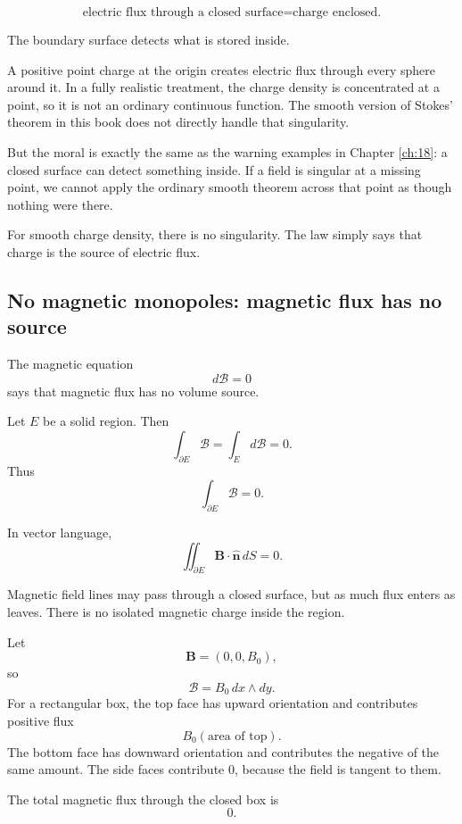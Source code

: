 \[
\boxed{
    \text{electric flux through a closed surface}
    =
    \text{charge enclosed.}
}
\]

The boundary surface detects what is stored inside.

\begin{example}
A positive point charge at the origin creates electric flux through every sphere around
it.  In a fully realistic treatment, the charge density is concentrated at a point, so it is
not an ordinary continuous function.  The smooth version of Stokes' theorem in this
book does not directly handle that singularity.

But the moral is exactly the same as the warning examples in Chapter \ref{ch:18}:
a closed surface can detect something inside.  If a field is singular at a missing point,
we cannot apply the ordinary smooth theorem across that point as though nothing were
there.
\end{example}

For smooth charge density, there is no singularity.  The law simply says that charge is
the source of electric flux.

\subsection{No magnetic monopoles: magnetic flux has no source}

The magnetic equation
\[
    d\mathcal B=0
\]
says that magnetic flux has no volume source.

Let \(E\) be a solid region.  Then
\[
    \int_{\partial E}\mathcal B
    =
    \int_E d\mathcal B
    =
    0.
\]
Thus
\[
\boxed{
    \int_{\partial E}\mathcal B=0.
}
\]

In vector language,
\[
\boxed{
    \iint_{\partial E}\mathbf B\cdot\widehat{\mathbf n}\,dS=0.
}
\]

Magnetic field lines may pass through a closed surface, but as much flux enters as
leaves.  There is no isolated magnetic charge inside the region.

\begin{example}
Let
\[
    \mathbf B=(0,0,B_0),
\]
so
\[
    \mathcal B=B_0\,dx\wedge dy.
\]
For a rectangular box, the top face has upward orientation and contributes positive
flux
\[
    B_0(\text{area of top}).
\]
The bottom face has downward orientation and contributes the negative of the same
amount.  The side faces contribute \(0\), because the field is tangent to them.

The total magnetic flux through the closed box is
\[
    0.
\]
\end{example}

